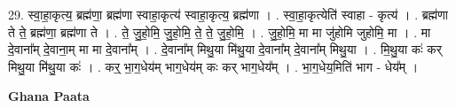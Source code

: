 \documentclass[17pt]{extarticle}
\begin{document}
29. स्वा॒हा॒कृत्य॒ ब्रह्म॑णा॒ ब्रह्म॑णा स्वाहा॒कृत्य॑ स्वाहा॒कृत्य॒ ब्रह्म॑णा । . स्वा॒हा॒कृत्येति॑ स्वाहा - कृत्य॑ । . ब्रह्म॑णा ते ते॒ ब्रह्म॑णा॒ ब्रह्म॑णा ते । . ते॒ जु॒हो॒मि॒ जु॒हो॒मि॒ ते॒ ते॒ जु॒हो॒मि॒ । . जु॒हो॒मि॒ मा मा जु॑होमि जुहोमि॒ मा । . मा दे॒वाना᳚म् दे॒वाना॒म् मा मा दे॒वाना᳚म् । . दे॒वाना᳚म् मिथु॒या मि॑थु॒या दे॒वाना᳚म् दे॒वाना᳚म् मिथु॒या । . मि॒थु॒या कः॑ कर् मिथु॒या मि॑थु॒या कः॑ । . कर्॒ भा॒ग॒धेय॑म् भाग॒धेय॑म् कः कर् भाग॒धेय᳚म् । . भा॒ग॒धेय॒मिति॑ भाग - धेय᳚म् । \newline

\textbf{Ghana Paata } \newline
\end{document}
